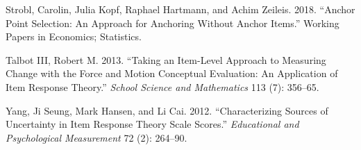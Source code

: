 \documentclass[
  11pt,
]{article}
\begin{document}
\leavevmode\hypertarget{ref-strobl2018anchor}{}%
Strobl, Carolin, Julia Kopf, Raphael Hartmann, and Achim Zeileis. 2018. ``Anchor Point Selection: An Approach for Anchoring Without Anchor Items.'' Working Papers in Economics; Statistics.

\leavevmode\hypertarget{ref-talbot2013taking}{}%
Talbot III, Robert M. 2013. ``Taking an Item-Level Approach to Measuring Change with the Force and Motion Conceptual Evaluation: An Application of Item Response Theory.'' \emph{School Science and Mathematics} 113 (7): 356--65.

\leavevmode\hypertarget{ref-yang2012characterizing}{}%
Yang, Ji Seung, Mark Hansen, and Li Cai. 2012. ``Characterizing Sources of Uncertainty in Item Response Theory Scale Scores.'' \emph{Educational and Psychological Measurement} 72 (2): 264--90.
\end{document}
